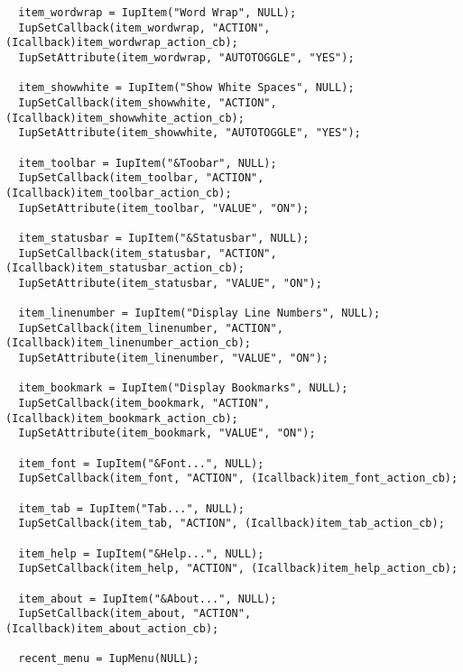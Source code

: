 \documentclass{ctexart}
\begin{document}
\begin{lstlisting}
  item_wordwrap = IupItem("Word Wrap", NULL);
  IupSetCallback(item_wordwrap, "ACTION", (Icallback)item_wordwrap_action_cb);
  IupSetAttribute(item_wordwrap, "AUTOTOGGLE", "YES");

  item_showwhite = IupItem("Show White Spaces", NULL);
  IupSetCallback(item_showwhite, "ACTION", (Icallback)item_showwhite_action_cb);
  IupSetAttribute(item_showwhite, "AUTOTOGGLE", "YES");

  item_toolbar = IupItem("&Toobar", NULL);
  IupSetCallback(item_toolbar, "ACTION", (Icallback)item_toolbar_action_cb);
  IupSetAttribute(item_toolbar, "VALUE", "ON");

  item_statusbar = IupItem("&Statusbar", NULL);
  IupSetCallback(item_statusbar, "ACTION", (Icallback)item_statusbar_action_cb);
  IupSetAttribute(item_statusbar, "VALUE", "ON");

  item_linenumber = IupItem("Display Line Numbers", NULL);
  IupSetCallback(item_linenumber, "ACTION", (Icallback)item_linenumber_action_cb);
  IupSetAttribute(item_linenumber, "VALUE", "ON");

  item_bookmark = IupItem("Display Bookmarks", NULL);
  IupSetCallback(item_bookmark, "ACTION", (Icallback)item_bookmark_action_cb);
  IupSetAttribute(item_bookmark, "VALUE", "ON");

  item_font = IupItem("&Font...", NULL);
  IupSetCallback(item_font, "ACTION", (Icallback)item_font_action_cb);

  item_tab = IupItem("Tab...", NULL);
  IupSetCallback(item_tab, "ACTION", (Icallback)item_tab_action_cb);

  item_help = IupItem("&Help...", NULL);
  IupSetCallback(item_help, "ACTION", (Icallback)item_help_action_cb);

  item_about = IupItem("&About...", NULL);
  IupSetCallback(item_about, "ACTION", (Icallback)item_about_action_cb);

  recent_menu = IupMenu(NULL);


\end{lstlisting}
\end{document}
